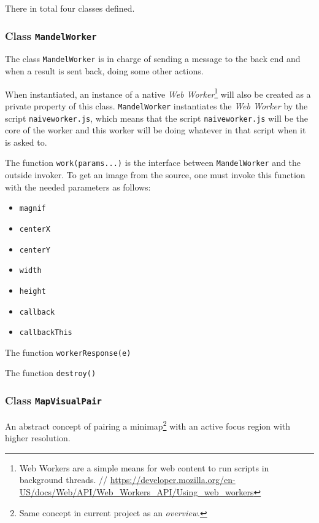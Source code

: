 There in total four classes defined.

\subsubsection{Class \texttt{MandelWorker}}

The class \texttt{MandelWorker} is in charge of sending a message to the back end and when a result is sent back, doing some other actions.

When instantiated, an instance of a native \emph{Web Worker}\footnote{ Web Workers are a simple means for web content to run scripts in background threads. // \url{https://developer.mozilla.org/en-US/docs/Web/API/Web_Workers_API/Using_web_workers}} will also be created as a private property of this class. \texttt{MandelWorker} instantiates the \emph{Web Worker} by the script \texttt{naive\-worker.js}, which means that the script \texttt{naive\-worker.js} will be the core of the worker and this worker will be doing whatever in that script when it is asked to.

The function \texttt{work(params...)} is the interface between \texttt{MandelWorker} and the outside invoker. To get an image from the source, one must invoke this function with the needed parameters as follows:

\begin{itemize}
    \item \texttt{magnif}
    \item \texttt{centerX}
    \item \texttt{centerY}
    \item \texttt{width}
    \item \texttt{height}
    \item \texttt{callback}   
    \item \texttt{callbackThis}   
\end{itemize}

The function \texttt{workerResponse(e)}

The function \texttt{destroy()}

\subsubsection{Class \texttt{MapVisualPair}}

An abstract concept of pairing a minimap\footnote{ Same concept in current project as an \emph{overview}. } with an active focus region with higher resolution.


